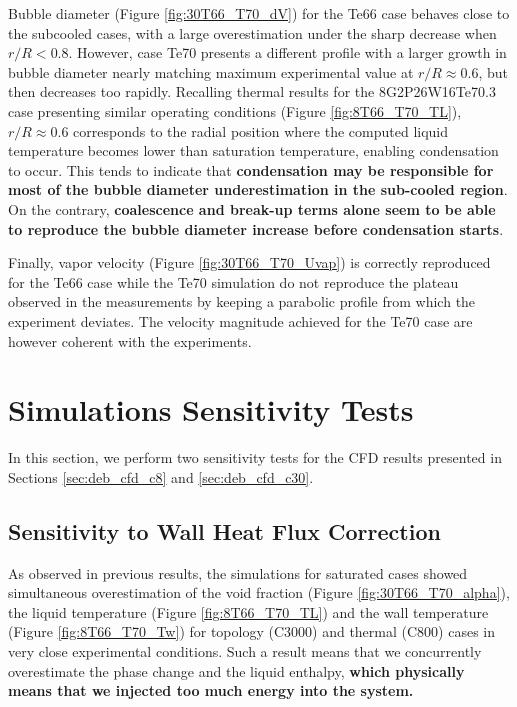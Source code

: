 Bubble diameter (Figure \ref{fig:30T66_T70_dV}) for the Te66 case behaves close to the subcooled cases, with a large overestimation under the sharp decrease when $r/R < 0.8$. However, case Te70 presents a different profile with a larger growth in bubble diameter nearly matching maximum experimental value at $r/R \approx 0.6$, but then decreases too rapidly. Recalling thermal results for the 8G2P26W16Te70.3 case presenting similar operating conditions (Figure \ref{fig:8T66_T70_TL}), $r/R \approx 0.6$ corresponds to the radial position where the computed liquid temperature becomes lower than saturation temperature, enabling condensation to occur. This tends to indicate that \textbf{condensation may be responsible for most of the bubble diameter underestimation in the sub-cooled region}. On the contrary, \textbf{coalescence and break-up terms alone seem to be able to reproduce the bubble diameter increase before condensation starts}.

\npar

Finally, vapor velocity (Figure \ref{fig:30T66_T70_Uvap}) is correctly reproduced for the Te66 case while the Te70 simulation do not reproduce the plateau observed in the measurements by keeping a parabolic profile from which the experiment deviates. The velocity magnitude achieved for the Te70 case are however coherent with the experiments. 


\section{Simulations Sensitivity Tests}

In this section, we perform two sensitivity tests for the CFD results presented in Sections \ref{sec:deb_cfd_c8} and \ref{sec:deb_cfd_c30}. 


\subsection{Sensitivity to Wall Heat Flux Correction}


As observed in previous results, the simulations for saturated cases showed simultaneous overestimation of the void fraction (Figure \ref{fig:30T66_T70_alpha}), the liquid temperature (Figure \ref{fig:8T66_T70_TL}) and the wall temperature (Figure \ref{fig:8T66_T70_Tw}) for topology (C3000) and thermal (C800) cases in very close experimental conditions. Such a result means that we concurrently overestimate the phase change and the liquid enthalpy, \textbf{which physically means that we injected too much energy into the system.}

